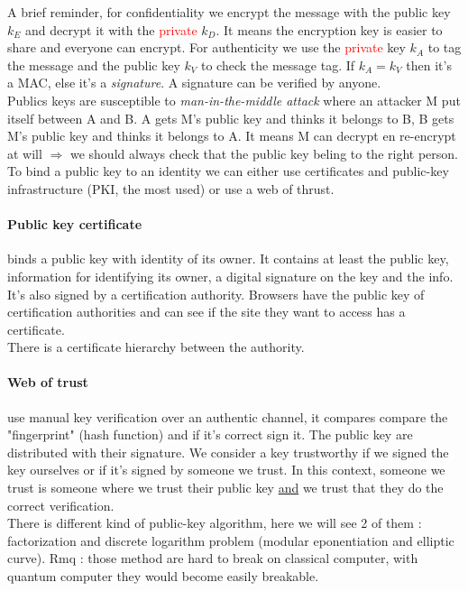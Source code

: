\documentclass[11pt,a4paper]{report}
\begin{document}
A brief reminder, for confidentiality we encrypt the message with the \textcolor{ao}{public} key $k_E$ and decrypt it with the \textcolor{red}{private} $k_D$. It means the encryption key is easier to share and everyone can encrypt. For authenticity we use the \textcolor{red}{private} key $k_A$ to tag the message and the \textcolor{ao}{public} key $k_V$ to check the message tag. If $k_A = k_V$ then it's a MAC, else it's a \emph{signature}. A signature can be verified by anyone.\\

Publics keys are susceptible to \emph{man-in-the-middle attack} where an attacker M put itself between A and B. A gets M's public key and thinks it belongs to B, B gets M's public key and thinks it belongs to A. It means M can decrypt en re-encrypt at will $\Longrightarrow$ we should always check that the public key beling to the right person. To bind a public key to an identity we can either use certificates and public-key infrastructure (PKI, the most used) or use a web of thrust.\\

\paragraph{Public key certificate} binds a public key with identity of its owner. It contains at least the public key, information for identifying its owner, a digital signature on the key and the info. It's also signed by a certification authority. Browsers have the public key of certification authorities and can see if the site they want to access has a certificate.\\
There is a certificate hierarchy between the authority.

\paragraph{Web of trust} use manual key verification over an authentic channel, it compares compare the "fingerprint" (hash function) and if it's correct sign it. The public key are distributed with their signature. We consider a key trustworthy if we signed the key ourselves or if it's signed by someone we trust. In this context, someone we trust is someone where we trust their public key \underline{and} we trust that they do the correct verification.\\

There is different kind of public-key algorithm, here we will see 2 of them : factorization and discrete logarithm problem (modular eponentiation and elliptic curve). Rmq : those method are hard to break on classical computer, with quantum computer they would become easily breakable.\\
\end{document}
